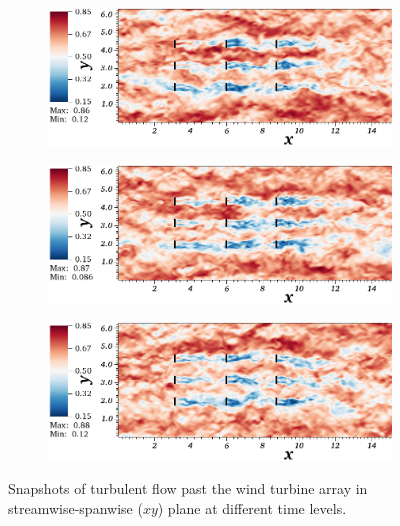 \begin{figure}
\begin{subfigure}[t]{0.5\textwidth}
                \caption{}
                \label{fig:snap3}
        \end{subfigure}%
        \centering
        \begin{subfigure}[t]{0.5\textwidth}
                \includegraphics[width=\linewidth]{movie_xy_cropped/movie_xy_26.png}
                \caption{}
                \label{fig:snap4}
        \end{subfigure}
     \centering
        \begin{subfigure}[t]{0.5\textwidth}
                \includegraphics[width=\linewidth]{movie_xy_cropped/movie_xy_33.png}
                \caption{}
                \label{fig:snap5}
        \end{subfigure}%
        \centering
        \begin{subfigure}[t]{0.5\textwidth}
                \includegraphics[width=\linewidth]{movie_xy_cropped/movie_xy_38.png}
                \caption{}
                \label{fig:snap6}
        \end{subfigure}
        \caption[Temporal Snapshots in $xy$ plane]{Snapshots of turbulent flow past the wind turbine array in streamwise-spanwise ($xy$) plane at different time levels.}\label{fig:snap_xy}
\end{figure}


